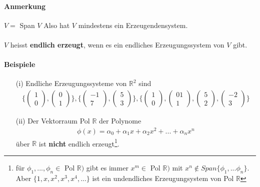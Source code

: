 \documentclass[11pt]{report}
\newcommand*\Zb[1] {\mathbb{#1}}
\newcommand*\f[1] {\textbf{#1}}
\begin{document}
\paragraph{Anmerkung} $V =$ Span $V$ Also hat $V$ mindestens ein Erzeugendensystem.\\\\
$V$ heisst \f{endlich erzeugt}, wenn es ein endliches Erzeugungssystem von $V$ gibt.
\paragraph{Beispiele}
\begin{itemize}
 \item[(i)] Endliche Erzeugungssysteme von $\Zb{R}^2$ sind
\begin{align}
  \{\begin{pmatrix} 1 \\ 0 \end{pmatrix}, \begin{pmatrix} 0 \\ 1 \end{pmatrix}\}, \{\begin{pmatrix} -1 \\ 7\end{pmatrix}, \begin{pmatrix}5 \\ 3 \end{pmatrix}\}, \{\begin{pmatrix} 1 \\ 0\end{pmatrix}, \begin{pmatrix} 01 \\ 1 \end{pmatrix}, \begin{pmatrix} 5 \\ 2 \end{pmatrix}, \begin{pmatrix} -2 \\ 3 \end{pmatrix} \}
\end{align}
\item[(ii)] Der Vektorraum Pol $\Zb{R}$ der Polynome
\begin{align}
 \phi(x) = \alpha_0 + \alpha_1 x + \alpha_2 x^2 + ... + \alpha_n x^n
\end{align}
über $\Zb{R}$ ist \f{nicht} endlich erzeugt\footnote{für $\phi_1, ..., \phi_n \in$ Pol $\Zb{R})$ gibt es immer $x^m \in$ Pol $\Zb{R})$ mit $x^n \notin Span\{\phi_1, ... \phi_n\}$. Aber $\{1, x, x^2, x^3, x^4, ...\}$ ist ein undendliches Erzeugungsystem von Pol $\Zb{R}$}. 

\end{itemize}
\end{document}
